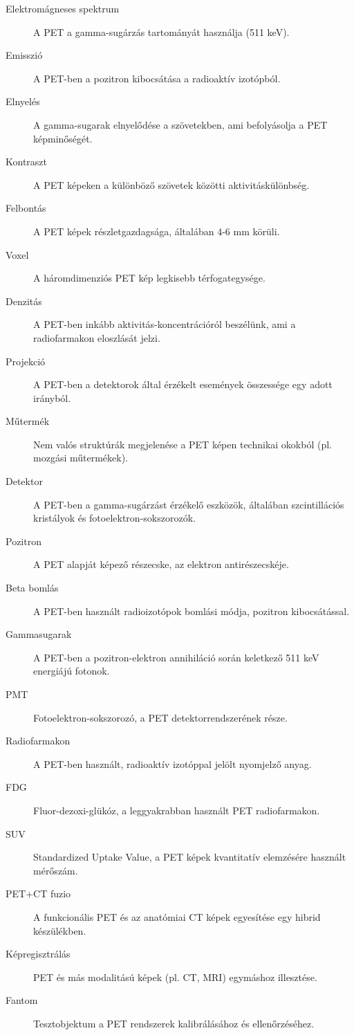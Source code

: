 \documentclass[a4paper,12pt]{article}
\begin{document}
\begin{description}
\item[Elektromágneses spektrum] A PET a gamma-sugárzás tartományát használja (511 keV). \item[Emisszió] A PET-ben a pozitron kibocsátása a radioaktív izotópból. \item[Elnyelés] A gamma-sugarak elnyelődése a szövetekben, ami befolyásolja a PET képminőségét. \item[Kontraszt] A PET képeken a különböző szövetek közötti aktivitáskülönbség. \item[Felbontás] A PET képek részletgazdagsága, általában 4-6 mm körüli. \item[Voxel] A háromdimenziós PET kép legkisebb térfogategysége. \item[Denzitás] A PET-ben inkább aktivitás-koncentrációról beszélünk, ami a radiofarmakon eloszlását jelzi. \item[Projekció] A PET-ben a detektorok által érzékelt események összessége egy adott irányból. \item[Műtermék] Nem valós struktúrák megjelenése a PET képen technikai okokból (pl. mozgási műtermékek). \item[Detektor] A PET-ben a gamma-sugárzást érzékelő eszközök, általában szcintillációs kristályok és fotoelektron-sokszorozók. \item[Pozitron] A PET alapját képező részecske, az elektron antirészecskéje. \item[Beta bomlás] A PET-ben használt radioizotópok bomlási módja, pozitron kibocsátással. \item[Gammasugarak] A PET-ben a pozitron-elektron annihiláció során keletkező 511 keV energiájú fotonok. \item[PMT] Fotoelektron-sokszorozó, a PET detektorrendszerének része. \item[Radiofarmakon] A PET-ben használt, radioaktív izotóppal jelölt nyomjelző anyag. \item[FDG] Fluor-dezoxi-glükóz, a leggyakrabban használt PET radiofarmakon. \item[SUV] Standardized Uptake Value, a PET képek kvantitatív elemzésére használt mérőszám. \item[PET+CT fuzio] A funkcionális PET és az anatómiai CT képek egyesítése egy hibrid készülékben. \item[Képregisztrálás] PET és más modalitású képek (pl. CT, MRI) egymáshoz illesztése. \item[Fantom] Tesztobjektum a PET rendszerek kalibrálásához és ellenőrzéséhez.
\end{description}
\end{document}
